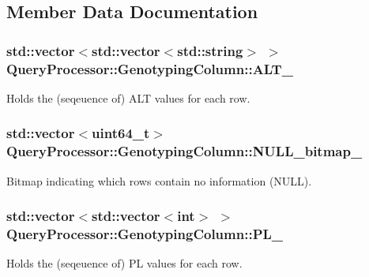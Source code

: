 \subsection{Member Data Documentation}
\hypertarget{classQueryProcessor_1_1GenotypingColumn_aec7f08945b5b05cfca39e4ef4c5651f2}{}
\subsubsection[{A\+L\+T\+\_\+}]{\setlength{\rightskip}{0pt plus 5cm}std\+::vector$<$std\+::vector$<$std\+::string$>$ $>$ Query\+Processor\+::\+Genotyping\+Column\+::\+A\+L\+T\+\_\+}\label{classQueryProcessor_1_1GenotypingColumn_aec7f08945b5b05cfca39e4ef4c5651f2}
Holds the (seqeuence of) A\+L\+T values for each row. \hypertarget{classQueryProcessor_1_1GenotypingColumn_a895c204d340ac791de00899589ec3ee8}{}
\subsubsection[{N\+U\+L\+L\+\_\+bitmap\+\_\+}]{\setlength{\rightskip}{0pt plus 5cm}std\+::vector$<$uint64\+\_\+t$>$ Query\+Processor\+::\+Genotyping\+Column\+::\+N\+U\+L\+L\+\_\+bitmap\+\_\+}\label{classQueryProcessor_1_1GenotypingColumn_a895c204d340ac791de00899589ec3ee8}
Bitmap indicating which rows contain no information (N\+U\+L\+L). \hypertarget{classQueryProcessor_1_1GenotypingColumn_a761eca75934173f40473bf673aad68a6}{}
\subsubsection[{P\+L\+\_\+}]{\setlength{\rightskip}{0pt plus 5cm}std\+::vector$<$std\+::vector$<$int$>$ $>$ Query\+Processor\+::\+Genotyping\+Column\+::\+P\+L\+\_\+}\label{classQueryProcessor_1_1GenotypingColumn_a761eca75934173f40473bf673aad68a6}
Holds the (seqeuence of) P\+L values for each row. \hypertarget{classQueryProcessor_1_1GenotypingColumn_a87123c6d37332b7a1bf9f711d40ca473}{}
